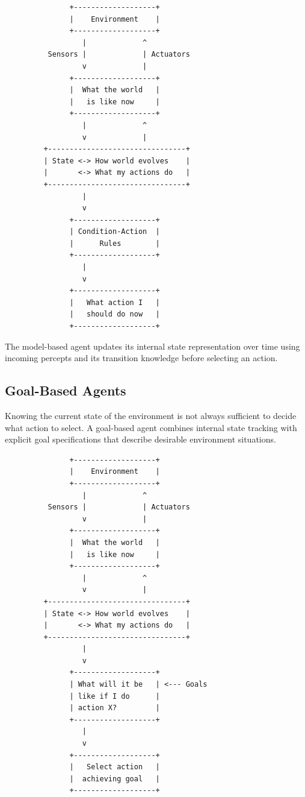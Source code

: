 \documentclass[12pt]{report}
\begin{document}
\begin{verbatim}
               +-------------------+
               |    Environment    |
               +-------------------+
                  |             ^
          Sensors |             | Actuators
                  v             |
               +-------------------+
               |  What the world   |
               |   is like now     |
               +-------------------+
                  |             ^
                  v             |
         +--------------------------------+
         | State <-> How world evolves    |
         |       <-> What my actions do   |
         +--------------------------------+
                  |
                  v
               +-------------------+
               | Condition-Action  |
               |      Rules        |
               +-------------------+
                  |
                  v
               +-------------------+
               |   What action I   |
               |   should do now   |
               +-------------------+
\end{verbatim}

The model-based agent updates its internal state representation over time using incoming percepts and its transition knowledge before selecting an action.

\subsection{Goal-Based Agents}

Knowing the current state of the environment is not always sufficient to decide what action to select. A goal-based agent combines internal state tracking with explicit goal specifications that describe desirable environment situations.

\begin{verbatim}
               +-------------------+
               |    Environment    |
               +-------------------+
                  |             ^
          Sensors |             | Actuators
                  v             |
               +-------------------+
               |  What the world   |
               |   is like now     |
               +-------------------+
                  |             ^
                  v             |
         +--------------------------------+
         | State <-> How world evolves    |
         |       <-> What my actions do   |
         +--------------------------------+
                  |
                  v
               +-------------------+
               | What will it be   | <--- Goals
               | like if I do      |
               | action X?         |
               +-------------------+
                  |
                  v
               +-------------------+
               |   Select action   |
               |  achieving goal   |
               +-------------------+
\end{verbatim}
\end{document}

